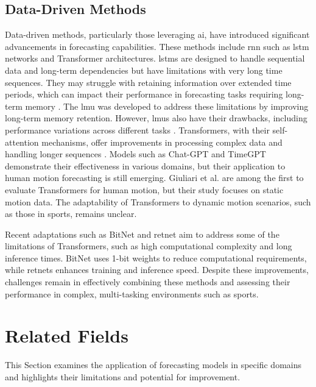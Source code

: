 \subsection{Data-Driven Methods}
\label{sec:data_driven_methods}
Data-driven methods, particularly those leveraging \gls{ai}, have introduced significant advancements in forecasting capabilities. These methods include \gls{rnn} such as \gls{lstm} networks and Transformer architectures. \glspl{lstm} \cite{lstm} are designed to handle sequential data and long-term dependencies but have limitations with very long time sequences. They may struggle with retaining information over extended time periods, which can impact their performance in forecasting tasks requiring long-term memory \cite{lmu}. The \gls{lmu} \cite{lmu} was developed to address these limitations by improving long-term memory retention. However, \glspl{lmu} also have their drawbacks, including performance variations across different tasks \cite{gosalci}. Transformers, with their self-attention mechanisms, offer improvements in processing complex data and handling longer sequences \cite{transformer}. Models such as Chat-GPT \cite{gpt} and TimeGPT \cite{timegpt} demonstrate their effectiveness in various domains, but their application to human motion forecasting is still emerging. Giuliari et al. \cite{giuliari2020transformer} are among the first to evaluate Transformers for human motion, but their study focuses on static motion data. The adaptability of Transformers to dynamic motion scenarios, such as those in sports, remains unclear.

Recent adaptations such as BitNet \cite{BitNet2023} and \gls{retnet} \cite{RetNet} aim to address some of the limitations of Transformers, such as high computational complexity and long inference times. BitNet uses 1-bit weights to reduce computational requirements, while \glspl{retnet} enhances training and inference speed. Despite these improvements, challenges remain in effectively combining these methods and assessing their performance in complex, multi-tasking environments such as sports.

\section{Related Fields}
\label{rel:rel}
This Section examines the application of forecasting models in specific domains and highlights their limitations and potential for improvement.

